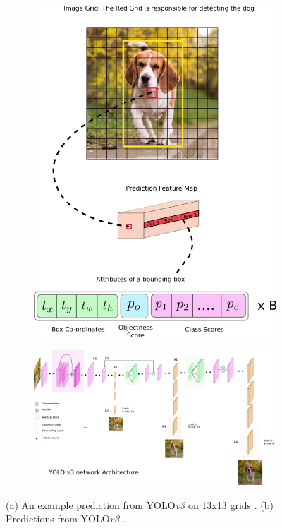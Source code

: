 \documentclass[letterpaper]{article}
\begin{document}
\begin{figure}[h]
    \begin{subfigure}{0.35\textwidth}
        \includegraphics[width = \textwidth, height = \textwidth]{Images/Yolo-MS-COCO-Attacked/yolo-5.png}
    \end{subfigure}
    \begin{subfigure}{0.65\textwidth}
        \includegraphics[width = \textwidth, height = \textwidth]{Images/yolov3-arch.png}
    \end{subfigure}
    \caption{(a) An example prediction from YOLO\emph{v3} on 13x13 grids \cite{kathuria_2019}. (b) Predictions from YOLO\emph{v3} \cite{kathuria_2018}.}
    \label{fig:yolo-pred}
\end{figure}
\end{document}
